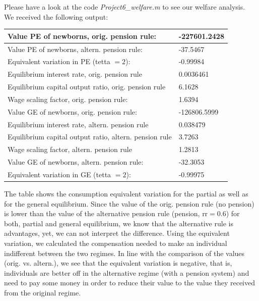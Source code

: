 \documentclass[12pt,a4paper]{article}
\begin{document}
Please have a look at the code \textit{Project6\_welfare.m} to see our welfare analysis.\\
We received the following output: 

\begin{center}
\begin{tabular}{ |l|l| } 
\hline
Value PE of newborns, orig. pension rule: & -227601.2428\\
\hline
Value PE of newborns, altern. pension rule: & -37.5467\\
\hline
Equivalent variation in PE (tetta $=2$): & -0.99984 \\ %
\hline
Equilibrium interest rate, orig. pension rule & 0.0036461\\
Equilibrium capital output ratio, orig. pension rule & 6.1628\\
Wage scaling factor, orig. pension rule: & 1.6394\\
Value GE of newborns, orig. pension rule: & -126806.5999\\
\hline
Equilibrium interest rate, altern. pension rule & 0.038479\\
Equilibrium capital output ratio, altern. pension rule & 3.7263\\
Wage scaling factor, altern. pension rule & 1.2813\\
Value GE of newborns, altern. pension rule: & -32.3053\\
\hline
Equivalent variation in GE (tetta $=2$): &  -0.99975 \\ %
\hline
\end{tabular}
\end{center}

The table shows the consumption equivalent variation for the partial as well as for the general equilibrium. Since the value of the orig. pension rule (no pension) is lower than the value of the alternative pension rule (pension, rr$=$0.6) for both, partial and general equilibrium, we know that the alternative rule is advantages, yet, we can not interpret the difference. Using the equivalent variation, we calculated the compensation needed to make an individual indifferent between the two regimes. In line with the comparison of the values (orig. vs. altern.), we see that the equivalent variation is negative, that is, individuals are better off in the alternative regime (with a pension system) and need to pay some money in order to reduce their value to the value they received from the original regime.
\end{document}
